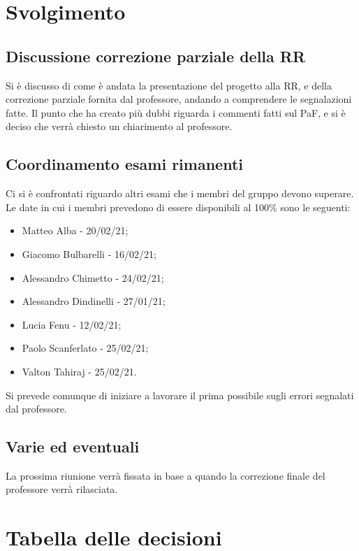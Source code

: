\documentclass[]{article}
\begin{document}
	\newpage

	\section{Svolgimento}
		\subsection{Discussione correzione parziale della RR}
		Si è discusso di come è andata la presentazione del progetto alla RR, e della correzione parziale fornita dal professore, andando a comprendere le segnalazioni fatte.
		Il punto che ha creato più dubbi riguarda i commenti fatti sul PaF, e si è deciso che verrà chiesto un chiarimento al professore.\\
		
		\subsection{Coordinamento esami rimanenti}
		Ci si è confrontati riguardo altri esami che i membri del gruppo devono superare.\\
		Le date in cui i membri prevedono di essere disponibili al 100\% sono le seguenti:
		\begin{itemize}
			\item Matteo Alba - 20/02/21;
			\item Giacomo Bulbarelli - 16/02/21;
			\item Alessandro Chimetto - 24/02/21;
			\item Alessandro Dindinelli - 27/01/21;
			\item Lucia Fenu - 12/02/21;
			\item Paolo Scanferlato - 25/02/21;
			\item Valton Tahiraj - 25/02/21.
		\end{itemize}
		Si prevede comunque di iniziare a lavorare il prima possibile sugli errori segnalati dal professore.\\
		
		\subsection{Varie ed eventuali}
		La prossima riunione verrà fissata in base a quando la correzione finale del professore verrà rilasciata.\\
		
		\newpage
		
		\section{Tabella delle decisioni}
		
\end{document}
